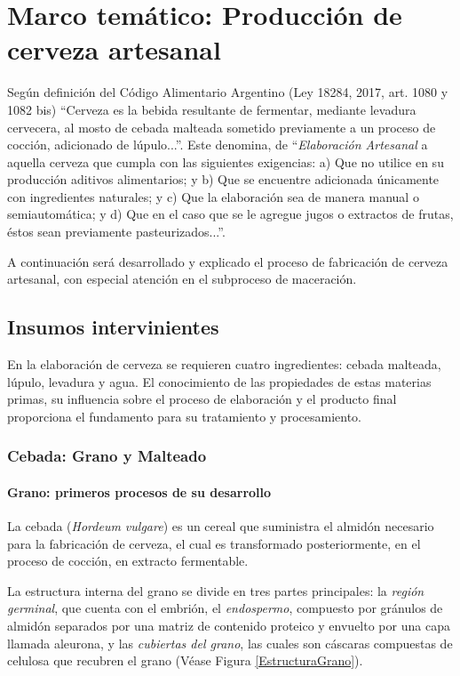 \chapter{ Marco temático: Producción de cerveza artesanal}
    
    \par Según definición del Código Alimentario Argentino (Ley 18284, 2017, art. 1080 y 1082 bis) “Cerveza es la bebida resultante de fermentar, mediante levadura cervecera, al mosto de cebada malteada sometido previamente a un proceso de cocción, adicionado de lúpulo...”. Este denomina, de “\textit{Elaboración Artesanal} a aquella cerveza que cumpla con las siguientes exigencias: a) Que no utilice en su producción aditivos alimentarios; y b) Que se encuentre adicionada únicamente con ingredientes naturales; y c) Que la elaboración sea de manera manual o semiautomática; y d) Que en el caso que se le agregue jugos o extractos de frutas, éstos sean previamente pasteurizados...”. 
    
    \par A continuación será desarrollado y explicado el proceso de fabricación de cerveza artesanal, con especial atención en el subproceso de maceración.
    
    \section{Insumos intervinientes}
        \par En la elaboración de cerveza se requieren cuatro ingredientes: cebada malteada, lúpulo, levadura y agua. El conocimiento de las propiedades de estas materias primas, su influencia sobre el proceso de elaboración y el producto final proporciona el fundamento para su tratamiento  y  procesamiento.
        
        
    	
        \subsection{Cebada: Grano y Malteado}
            \subsubsection{Grano: primeros procesos de su desarrollo}
                \par La cebada (\textit{Hordeum vulgare}) es un cereal que suministra el almidón necesario para la fabricación de cerveza, el cual es transformado posteriormente, en el proceso de cocción, en extracto fermentable.
                \par La estructura interna del grano se divide en tres partes principales: la \textit{región germinal}, que cuenta con el embrión, el \textit{endospermo}, compuesto por gránulos de almidón separados por una matriz de contenido proteico y envuelto por una capa llamada aleurona, y las \textit{cubiertas del grano}, las cuales son cáscaras compuestas de celulosa que recubren el grano (Véase Figura \ref{EstructuraGrano}).
        
